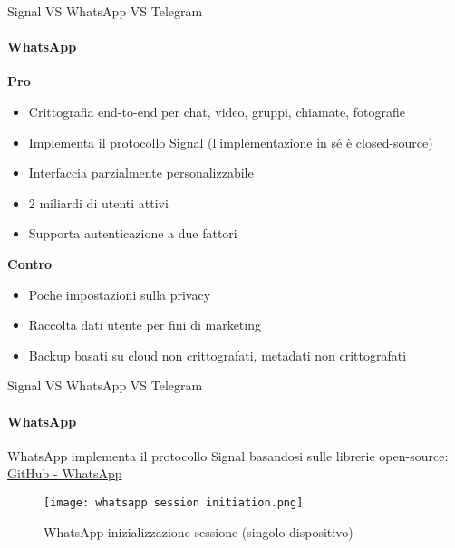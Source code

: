 \begin{frame}{Signal VS WhatsApp VS Telegram}
    \framesubtitle{WhatsApp}

    \textbf{Pro}
    \begin{itemize}
        \item Crittografia end-to-end per chat, video, gruppi, chiamate, fotografie
        \item Implementa il protocollo Signal (l'implementazione in sé è closed-source)
        \item Interfaccia parzialmente personalizzabile
        \item 2 miliardi di utenti attivi
        \item Supporta autenticazione a due fattori
    \end{itemize}\pause

    \textbf{Contro}
    \begin{itemize}
        \item Poche impostazioni sulla privacy
        \item Raccolta dati utente per fini di marketing
        \item Backup basati su cloud non crittografati, metadati non crittografati
    \end{itemize}

\end{frame}

\begin{frame}{Signal VS WhatsApp VS Telegram}
    \framesubtitle{WhatsApp}
    WhatsApp implementa il protocollo Signal basandosi sulle librerie open-source:
    \href{http://github.com/whispersystems/libsignal-protocol-java/}{GitHub - WhatsApp}\newline\pause

    \begin{figure}
        \centering
        \texttt{[image: whatsapp session initiation.png]}
        \caption{WhatsApp inizializzazione sessione (singolo dispositivo)}
        \label{tag: wa session initiation}
    \end{figure}
    
\end{frame}